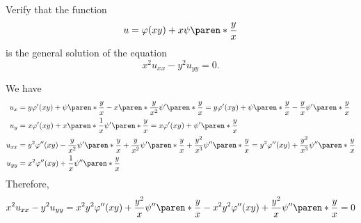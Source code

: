 \documentclass[11pt]{penrose}
\begin{document}
\begin{problem}{5}
    Verify that the function
    \begin{equation*}
        u = \varphi(xy) + x \psi\paren*{\frac{y}{x}}
    \end{equation*}
    is the general solution of the equation
    \begin{equation*}
        x^2 u_{xx} - y^2 u_{yy} = 0.
    \end{equation*}

    \solution We have
    \begin{align*}
        u_{x} &= y \varphi'(xy) + \psi\paren*{\frac{y}{x}} - x \paren*{\frac{y}{x^2}} \psi'\paren*{\frac{y}{x}} = y \varphi'(xy) + \psi\paren*{\frac{y}{x}} - \frac{y}{x} \psi'\paren*{\frac{y}{x}}\\
        u_{y} &= x \varphi'(xy) + x \paren*{\frac{1}{x}} \psi'\paren*{\frac{y}{x}} = x \varphi'(xy) + \psi'\paren*{\frac{y}{x}}\\
        u_{xx} &= y^2 \varphi''(xy) - \frac{y}{x^2} \psi'\paren*{\frac{y}{x}} + \frac{y}{x^2} \psi'\paren*{\frac{y}{x}} + \frac{y^2}{x^3} \psi''\paren*{\frac{y}{x}}
        = y^2 \varphi''(xy) + \frac{y^2}{x^3} \psi''\paren*{\frac{y}{x}}\\
        u_{yy} &= x^2 \varphi''(xy) + \frac{1}{x} \psi''\paren*{\frac{y}{x}}
    \end{align*}
    Therefore,
    \begin{equation*}
        x^2 u_{xx} - y^2 u_{yy} = x^2 y^2 \varphi''(xy) + \frac{y^2}{x} \psi''\paren*{\frac{y}{x}} - x^2 y^2 \varphi''(xy) + \frac{y^2}{x} \psi''\paren*{\frac{y}{x}} = 0
    \end{equation*}
\end{problem}
\end{document}
